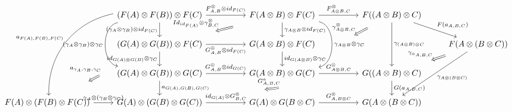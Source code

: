 \documentclass[10pt]{llncs}
\begin{document}
\begin{definition}
\begin{itemize}
$${\begin{tikzcd}[ampersand replacement=\&]
\&
(F(A) \otimes F(B)) \otimes F(C)
\arrow{rr}{F^{\otimes}_{A,B} \otimes id_{F(C)}}
\arrow[swap]{d}{(\gamma_A \otimes \gamma_B) \otimes id_{F(C)}}
\arrow[swap,bend right=80]{dd}{(\gamma_A \otimes \gamma_B) \otimes \gamma_C}
\arrow[swap,bend right=40]{dddl}{a_{F(A),F(B),F(C)}}
\&\&
F(A \otimes B) \otimes F(C)
\arrow{rr}{F^{\otimes}_{A\otimes B,C}}
\arrow{d}{\gamma_{A\otimes B} \otimes id_{F(C)}}
\arrow[bend left=80]{dd}{\gamma_{A \otimes B} \otimes \gamma_C}
\arrow[Rightarrow, shorten >=1.1cm, shorten <=0.8cm,swap]{dll}{Id_{id_{F(A)}} \otimes \gamma_{B,C}^{\otimes}}
\&\&
F((A \otimes B) \otimes C)
\arrow{dr}{F(a_{A,B,C})}
\arrow{dd}{\gamma_{(A\otimes B) \otimes C}}
\arrow[Rightarrow, shorten >=2.8cm, shorten <=0.5cm, swap,near start]{ddll}{\gamma_{A\otimes B, C}^{\otimes}}
\\
\&
(G(A) \otimes G(B)) \otimes F(C)
\arrow[swap]{rr}{G^{\otimes}_{A,B} \otimes id_{F(C)}}
\arrow[swap]{d}{id_{G(A) \otimes G(B)} \otimes \gamma_C}
\arrow[Rightarrow, shorten >=1.3cm, shorten <=2.2cm,swap]{ddl}{a_{\gamma_A,\gamma_B,\gamma_C}}
\&\&
G(A \otimes B) \otimes F(C)
\arrow{d}{id_{G(A \otimes B)} \otimes \gamma_C}
\&\&\&
F(A \otimes (B \otimes C))
\arrow{ddl}{\gamma_{A \otimes (B \otimes C)}}
\arrow[Rightarrow, shorten >=0.8cm, shorten <=0.5cm,swap]{dl}{\gamma_{\alpha_{A,B,C}}}
\\
\&
(G(A) \otimes G(B)) \otimes G(C) 
\arrow{rr}{G^{\otimes}_{A,B} \otimes id_{G(C)}}
\arrow{d}{a_{G(A),G(B),G(C)}}
\&\&
G(A \otimes B) \otimes G(C)
\arrow{rr}{G^{\otimes}_{A\otimes B,C}}
\&\&
G((A \otimes B) \otimes C)
\arrow{d}{G(a_{A,B,C})}
\arrow[Rightarrow, shorten >=2.5cm, shorten <=3.4cm,swap]{dllll}{G^{a}_{A,B,C}}
\\
F(A) \otimes (F(B) \otimes F(C))
\arrow{r}{\gamma_A \otimes (\gamma_B \otimes \gamma_C)}
\&
G(A) \otimes (G(B) \otimes G(C))
\arrow{rr}{id_{G(A)} \otimes G^{\otimes}_{B,C} }
\&\&
G(A) \otimes G(B \otimes C)
\arrow{rr}{G^{\otimes}_{A, B\otimes C}}
\&\&
G(A \otimes(B \otimes C))
\end{tikzcd}}$$

\end{itemize}
\end{definition}
\end{document}
